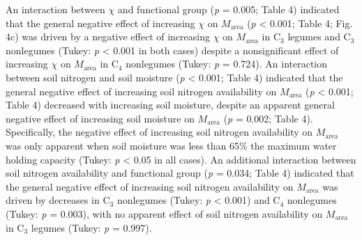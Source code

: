 An interaction between $\chi$ and functional group (\textit{p} = 0.005; Table 4) indicated that the general negative effect of increasing $\chi$ on $M_\mathrm{area}$ (\textit{p} < 0.001; Table 4; Fig. 4c) was driven by a negative effect of increasing $\chi$ on $M_\mathrm{area}$ in C$_3$ legumes and C$_3$ nonlegumes (Tukey: \textit{p} < 0.001 in both cases) despite a nonsignificant effect of increasing $\chi$ on $M_\mathrm{area}$ in C$_4$ nonlegumes (Tukey: \textit{p} = 0.724). An interaction between soil nitrogen and soil moisture (\textit{p} < 0.001; Table 4) indicated that the general negative effect of increasing soil nitrogen availability on $M_\mathrm{area}$ (\textit{p} < 0.001; Table 4) decreased with increasing soil moisture, despite an apparent general negative effect of increasing soil moisture on $M_\mathrm{area}$ (\textit{p} = 0.002; Table 4). Specifically, the negative effect of increasing soil nitrogen availability on $M_\mathrm{area}$ was only apparent when soil moisture was less than 65\% the maximum water holding capacity (Tukey: \textit{p} < 0.05 in all cases). An additional interaction between soil nitrogen availability and functional group (\textit{p} = 0.034; Table 4) indicated that the general negative effect of increasing soil nitrogen availability on $M_\mathrm{area}$ was driven by decreases in C$_3$ nonlegumes (Tukey: \textit{p} < 0.001) and C$_4$ nonlegumes (Tukey: \textit{p} = 0.003), with no apparent effect of soil nitrogen availability on $M_\mathrm{area}$ in C$_3$ legumes (Tukey: \textit{p} = 0.997).


